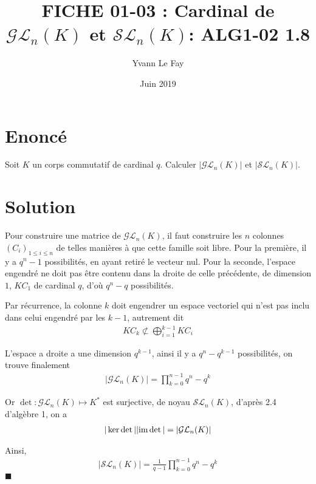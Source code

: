 \documentclass{article}
\newcommand*{\QED}{\hfill\ensuremath{\blacksquare}}%
\begin{document}
\title{FICHE 01-03 : Cardinal de $\mathcal{G}\mathcal{L}_n(K)$ et $\mathcal{S}\mathcal{L}_n(K)$: ALG1-02 1.8}
\author{Yvann Le Fay}
\date{Juin 2019}
\maketitle
\section*{Enoncé}
Soit $K$ un corps commutatif de cardinal $q$. Calculer $|\mathcal{G}\mathcal{L}_n(K)|$ et $|\mathcal{S}\mathcal{L}_n(K)|$.
\section*{Solution}
Pour construire une matrice de $\mathcal{G}\mathcal{L}_n(K)$, il faut construire les $n$ colonnes $(C_i)_{1\leq i\leq n}$ de telles manières à que cette famille soit libre. 
Pour la première, il y a $q^n-1$ possibilités, en ayant retiré le vecteur nul. Pour la seconde, l'espace engendré ne doit pas être contenu dans la droite de celle précédente, de dimension $1$, $KC_1$ de cardinal $q$, d'où $q^n-q$ possibilités.

Par récurrence, la colonne $k$ doit engendrer un espace vectoriel qui n'est pas inclu dans celui engendré par les $k-1$, autrement dit
\begin{align*}
KC_k\not\subset \bigoplus_{i=1}^{k-1} KC_i
\end{align*}

L'espace a droite a une dimension $q^{k-1}$, ainsi il y a $q^n-q^{k-1}$ possibilités, on trouve finalement
\begin{align*}
|\mathcal{G}\mathcal{L}_n(K)| = \prod_{k=0}^{n-1} q^n-q^k
\end{align*}



Or $\det :\mathcal{G}\mathcal{L}_n(K) \mapsto K^*$ est surjective, de noyau $\mathcal{S}\mathcal{L}_n(K)$, d'après 2.4 d'algèbre 1, on a 
\begin{align*}
|\ker \det | |\textup{im} \det| = |\mathcal{G}\mathcal{L}_n(K)|
\end{align*}

Ainsi,
\begin{align*}
|\mathcal{S}\mathcal{L}_n(K)| = \frac{1}{q-1}\prod_{k=0}^{n-1}q^n-q^k
\end{align*}
\QED
\end{document}
